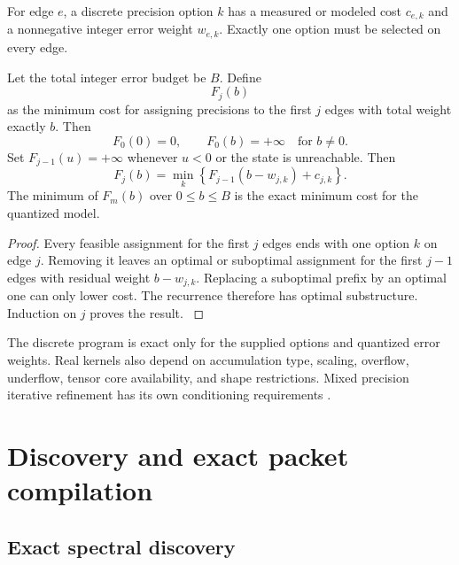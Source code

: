 \begin{definition}\label{main:definition:011}\label{def:dtype_option}
For edge \(e\), a discrete precision option \(k\) has a measured or modeled cost \(c_{e,k}\) and a nonnegative integer error weight \(w_{e,k}\). Exactly one option must be selected on every edge.
\end{definition}

\begin{theorem}\label{main:theorem:022}\label{thm:discrete_precision}
Let the total integer error budget be \(B\). Define
\[
F_j(b)
\]
as the minimum cost for assigning precisions to the first \(j\) edges with total weight exactly \(b\). Then
\[
F_0(0)=0,
\qquad
F_0(b)=+\infty
\quad\text{for }b\neq0.
\]
Set \(F_{j-1}(u)=+\infty\) whenever \(u<0\) or the state is unreachable. Then
\[
\boxed{
F_j(b)
=
\min_k
\left\{
F_{j-1}(b-w_{j,k})+c_{j,k}
\right\}.
}
\]
The minimum of \(F_m(b)\) over \(0\leq b\leq B\) is the exact minimum cost for the quantized model.
\end{theorem}

\begin{proof}\label{main:proof:041}
Every feasible assignment for the first \(j\) edges ends with one option \(k\) on edge \(j\). Removing it leaves an optimal or suboptimal assignment for the first \(j-1\) edges with residual weight \(b-w_{j,k}\). Replacing a suboptimal prefix by an optimal one can only lower cost. The recurrence therefore has optimal substructure. Induction on \(j\) proves the result.
\label{main:proof:041:end}\end{proof}

\begin{remark}\label{main:remark:003}\label{rem:dtype_boundary}
The discrete program is exact only for the supplied options and quantized error weights. Real kernels also depend on accumulation type, scaling, overflow, underflow, tensor core availability, and shape restrictions. Mixed precision iterative refinement has its own conditioning requirements \cite{CarsonHigham2018}.
\end{remark}

\section{Discovery and exact packet compilation}\label{main:section:009}\label{sec:compiler}

\subsection{Exact spectral discovery}\label{main:subsection:012}

